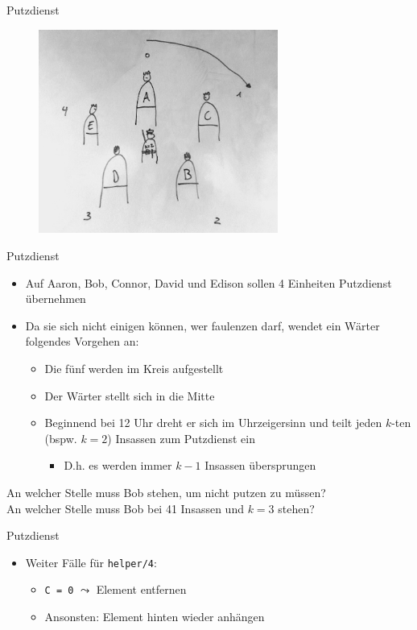\documentclass{beamer}
\newcommand{\code}[1]{
	\begin{mdframed}
		
	\end{mdframed}
}
\begin{document}
\begin{frame}{Putzdienst}
	\begin{figure}
		\includegraphics[width=0.7\textwidth]{images/putzdienst}
	\end{figure}
\end{frame}

\begin{frame}{Putzdienst}
	\begin{itemize}
		\item Auf Aaron, Bob, Connor, David und Edison sollen 4 Einheiten Putzdienst übernehmen
		\item Da sie sich nicht einigen können, wer faulenzen darf, wendet ein Wärter folgendes Vorgehen an:
		\begin{itemize}
			\item Die fünf werden im Kreis aufgestellt
			\item Der Wärter stellt sich in die Mitte
			\item Beginnend bei 12 Uhr dreht er sich im Uhrzeigersinn und teilt jeden $k$-ten (bspw. $k = 2$) Insassen zum Putzdienst ein
			\begin{itemize}
				\item D.h. es werden immer $k - 1$ Insassen übersprungen
			\end{itemize}
		\end{itemize}
	\end{itemize}

	An welcher Stelle muss Bob stehen, um nicht putzen zu müssen?\\
	\pause
	An welcher Stelle muss Bob bei 41 Insassen und $k = 3$ stehen?
\end{frame}

\begin{frame}{Putzdienst}
	\code{demos/putzdienst.pl}

	\begin{itemize}
		\item Weiter Fälle für \texttt{helper/4}:
		\begin{itemize}
			\item \texttt{C = 0} $\leadsto$ Element entfernen
			\item Ansonsten: Element hinten wieder anhängen
		\end{itemize}
	\end{itemize}
\end{frame}
\end{document}
